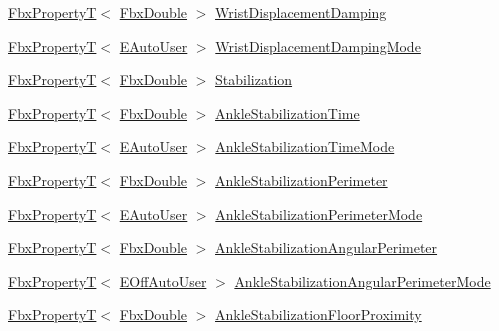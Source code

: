 \begin{DoxyCompactItemize}
\item 
\hyperlink{class_fbx_property_t}{Fbx\+PropertyT}$<$ \hyperlink{fbxtypes_8h_a171e72a1c46fc15c1a6c9c31948c1c5b}{Fbx\+Double} $>$ \hyperlink{class_fbx_character_a5bfe39a4704ca85d5bb599dfbd8aac26}{Wrist\+Displacement\+Damping}
\item 
\hyperlink{class_fbx_property_t}{Fbx\+PropertyT}$<$ \hyperlink{class_fbx_character_a5b03462709a82a15d89ee4563a4c49df}{E\+Auto\+User} $>$ \hyperlink{class_fbx_character_a9b406a1fb80fcc2f48239a80c14ee472}{Wrist\+Displacement\+Damping\+Mode}
\item 
\hyperlink{class_fbx_property_t}{Fbx\+PropertyT}$<$ \hyperlink{fbxtypes_8h_a171e72a1c46fc15c1a6c9c31948c1c5b}{Fbx\+Double} $>$ \hyperlink{class_fbx_character_a52d730a256495edf5b99b323f40cfcfe}{Stabilization}
\item 
\hyperlink{class_fbx_property_t}{Fbx\+PropertyT}$<$ \hyperlink{fbxtypes_8h_a171e72a1c46fc15c1a6c9c31948c1c5b}{Fbx\+Double} $>$ \hyperlink{class_fbx_character_a68bd7769c89201b7f652189a581585bc}{Ankle\+Stabilization\+Time}
\item 
\hyperlink{class_fbx_property_t}{Fbx\+PropertyT}$<$ \hyperlink{class_fbx_character_a5b03462709a82a15d89ee4563a4c49df}{E\+Auto\+User} $>$ \hyperlink{class_fbx_character_a3153af9c5fe1f2cd48022ccc4cfed804}{Ankle\+Stabilization\+Time\+Mode}
\item 
\hyperlink{class_fbx_property_t}{Fbx\+PropertyT}$<$ \hyperlink{fbxtypes_8h_a171e72a1c46fc15c1a6c9c31948c1c5b}{Fbx\+Double} $>$ \hyperlink{class_fbx_character_af18107f4ccd81a9d9f85f61814e77a0c}{Ankle\+Stabilization\+Perimeter}
\item 
\hyperlink{class_fbx_property_t}{Fbx\+PropertyT}$<$ \hyperlink{class_fbx_character_a5b03462709a82a15d89ee4563a4c49df}{E\+Auto\+User} $>$ \hyperlink{class_fbx_character_a311b4f7bef7007a17612aae9c9d1542d}{Ankle\+Stabilization\+Perimeter\+Mode}
\item 
\hyperlink{class_fbx_property_t}{Fbx\+PropertyT}$<$ \hyperlink{fbxtypes_8h_a171e72a1c46fc15c1a6c9c31948c1c5b}{Fbx\+Double} $>$ \hyperlink{class_fbx_character_a840b9b40bcdb89d082b95648dd5bf01e}{Ankle\+Stabilization\+Angular\+Perimeter}
\item 
\hyperlink{class_fbx_property_t}{Fbx\+PropertyT}$<$ \hyperlink{class_fbx_character_ab698a180e6f900ba8317257749c2ecce}{E\+Off\+Auto\+User} $>$ \hyperlink{class_fbx_character_a4e2e43a909f4393c6fbc8a8e98caa473}{Ankle\+Stabilization\+Angular\+Perimeter\+Mode}
\item 
\hyperlink{class_fbx_property_t}{Fbx\+PropertyT}$<$ \hyperlink{fbxtypes_8h_a171e72a1c46fc15c1a6c9c31948c1c5b}{Fbx\+Double} $>$ \hyperlink{class_fbx_character_aab4dcde4d515e2f489d7bbddbfa50460}{Ankle\+Stabilization\+Floor\+Proximity}

\end{DoxyCompactItemize}
